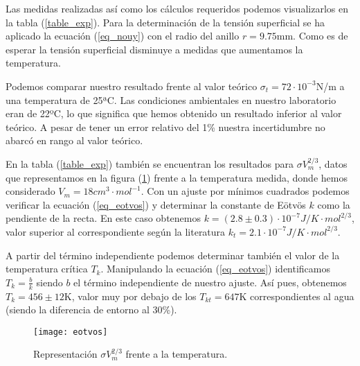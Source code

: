 Las medidas realizadas así como los cálculos requeridos podemos visualizarlos en la tabla (\ref{table_exp}). Para la determinación de la tensión superficial se ha aplicado la ecuación (\ref{eq_nouy}) con el radio del anillo $r = 9.75$mm. Como es de esperar la tensión superficial disminuye a medidas que aumentamos la temperatura.

Podemos comparar nuestro resultado frente al valor teórico $\sigma_t = 72\cdot 10^{-3}$N/m a una temperatura de 25ªC. Las condiciones ambientales en nuestro laboratorio eran de 22ºC, lo que significa que hemos obtenido un resultado inferior al valor teórico. A pesar de tener un error relativo del 1\% nuestra incertidumbre no abarcó en rango al valor teórico.

En la tabla (\ref{table_exp}) también se encuentran los resultados para $\sigma V_{m}^{2/3}$, datos que representamos en la figura (\ref{figure_eotvos}) frente a la temperatura medida, donde hemos considerado $V_m = 18 cm^3 \cdot mol^{-1}$. Con un ajuste por mínimos cuadrados podemos verificar la ecuación (\ref{eq_eotvos}) y determinar la constante de Eötvös $k$ como la pendiente de la recta. En este caso obtenemos $k = (2.8 \pm 0.3) \cdot 10^{-7} J/K \cdot mol^{2/3}$, valor superior al correspondiente según la literatura $k_t = 2.1 \cdot 10^{-7} J/K \cdot mol^{2/3}$.

A partir del término independiente podemos determinar también el valor de la temperatura crítica $T_k$. Manipulando la ecuación (\ref{eq_eotvos}) identificamos $T_k = \frac{b}{k}$ siendo $b$ el término independiente de nuestro ajuste. Así pues, obtenemos $T_k = 456 \pm 12$K, valor muy por debajo de los $T_{kt} = 647$K correspondientes al agua (siendo la diferencia de entorno al 30\%).

\begin{figure}[t]
	\texttt{[image: eotvos]}
	\caption{Representación $\sigma V_{m}^{2/3}$ frente a la temperatura.}
	\label{figure_eotvos}
\end{figure}